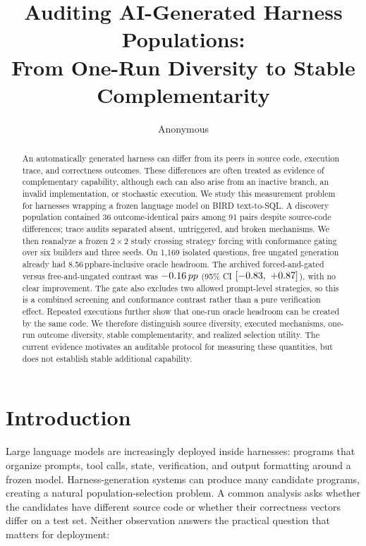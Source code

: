 \documentclass{article}
\title{Auditing AI-Generated Harness Populations:\\
From One-Run Diversity to Stable Complementarity}
\author{Anonymous}
\newcommand{\pp}{\,pp}
\begin{document}
\maketitle

\begin{abstract}
An automatically generated harness can differ from its peers in source code,
execution trace, and correctness outcomes. These differences are often treated
as evidence of complementary capability, although each can also arise from an
inactive branch, an invalid implementation, or stochastic execution. We study
this measurement problem for harnesses wrapping a frozen language model on BIRD
text-to-SQL. A discovery population contained 36 outcome-identical pairs among
91 pairs despite source-code differences; trace audits separated absent,
untriggered, and broken mechanisms. We then reanalyze a frozen $2\times2$
study crossing strategy forcing with conformance gating over six builders and
three seeds. On 1,169 isolated questions, free ungated generation already had
8.56\pp bare-inclusive oracle headroom. The archived forced-and-gated versus
free-and-ungated contrast was $\RevisionPrimaryDelta\pp$ (95\% CI
$[-0.83,\ +0.87]$), with no clear improvement. The gate also excludes two
allowed prompt-level strategies, so this is a combined screening and
conformance contrast rather than a pure verification effect. Repeated
executions further show that one-run oracle headroom can be created by the
same code. We therefore distinguish source diversity, executed mechanisms,
one-run outcome diversity, stable complementarity, and realized selection
utility. The current evidence motivates an auditable protocol for measuring
these quantities, but does not establish stable additional capability.
\end{abstract}

\section{Introduction}

Large language models are increasingly deployed inside harnesses: programs
that organize prompts, tool calls, state, verification, and output formatting
around a frozen model. Harness-generation systems can produce many candidate
programs, creating a natural population-selection problem. A common analysis
asks whether the candidates have different source code or whether their
correctness vectors differ on a test set. Neither observation answers the
practical question that matters for deployment:
\end{document}
